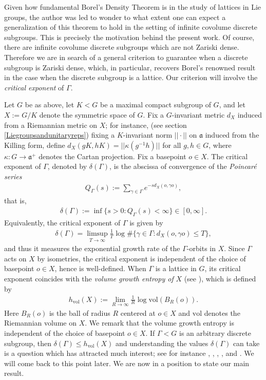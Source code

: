 \documentclass[psamsfonts]{amsart}
\theoremstyle{definition}
\theoremstyle{remark}
\numberwithin{equation}{section}
\begin{document}
\par 
Given how fundamental Borel's Density Theorem is in the study of lattices in Lie groups, the author was led to wonder to what extent one can expect a generalization of this theorem to hold in the setting of infinite covolume discrete subgroups. This is precisely the motivation behind the present work. Of course, there are infinite covolume discrete subgroups which are not Zariski dense. Therefore we are in search of a general criterion to guarantee when a discrete subgroup is Zariski dense, which, in particular, recovers Borel's renowned result in the case when the discrete subgroup is a lattice. Our criterion will involve the \emph{critical exponent} of $\Gamma$. 
\par 
Let $G$ be as above, let $K < G$ be a maximal compact subgroup of $G$, and let $X := G/K$ denote the symmetric space of $G$. Fix a $G$-invariant metric $d_{X}$ induced from a Riemannian metric on $X$; for instance, (see section \ref{Liegroupsandunitaryreps}) fixing a $K$-invariant norm $|| \cdot ||$ on $\mathfrak{a}$ induced from the Killing form, define $d_{X}(gK, hK) = ||\kappa(g^{-1}h)||$ for all $g,h \in G$, where $\kappa : G \rightarrow \mathfrak{a}^{+}$ denotes the Cartan projection. Fix a basepoint $o \in X$. The critical exponent of $\Gamma$, denoted by $\delta(\Gamma)$, is the abscissa of convergence of the \emph{Poincar\'e series}
\begin{align*}
Q_{\Gamma}(s) := \sum_{\gamma \in \Gamma} e^{-sd_{X}(o,\gamma o)},
\end{align*} that is,
\begin{align*}
\delta(\Gamma) := \inf \{s > 0 : Q_{\Gamma}(s) < \infty \} \in [0, \infty].
\end{align*} Equivalently, the critical exponent of $\Gamma$ is given by 
\begin{align*}
\delta(\Gamma) = \limsup_{T \to \infty} \frac{1}{T} \log \# \{ \gamma \in \Gamma : d_{X}(o, \gamma o) \leq T \},
\end{align*} and thus it measures the exponential growth rate of the $\Gamma$-orbits in $X$. Since $\Gamma$ acts on $X$ by isometries, the critical exponent is independent of the choice of basepoint $o \in X$, hence is well-defined. When $\Gamma$ is a lattice in $G$, its critical exponent coincides with the \emph{volume growth entropy of} $X$ (see \cite{Leu}), which is defined by 
\begin{align*}
h_{\mathrm{vol}}(X) := \lim_{R \to \infty} \frac{1}{R} \log \mathrm{vol}(B_{R}(o)).
\end{align*} Here $B_{R}(o)$ is the ball of radius $R$ centered at $o \in X$ and $\mathrm{vol}$ denotes the Riemannian volume on $X$. We remark that the volume growth entropy is independent of the choice of basepoint $o \in X$. If $\Gamma < G$ is an arbitrary discrete subgroup, then $\delta(\Gamma) \leq h_{\mathrm{vol}}(X)$ and understanding the values $\delta(\Gamma)$ can take is a question which has attracted much interest; see for instance \cite{Cor}, \cite{DL}, \cite{Leu}, \cite{Q2}, and \cite{S1}. We will come back to this point later. We are now in a position to state our main result.
\end{document}
